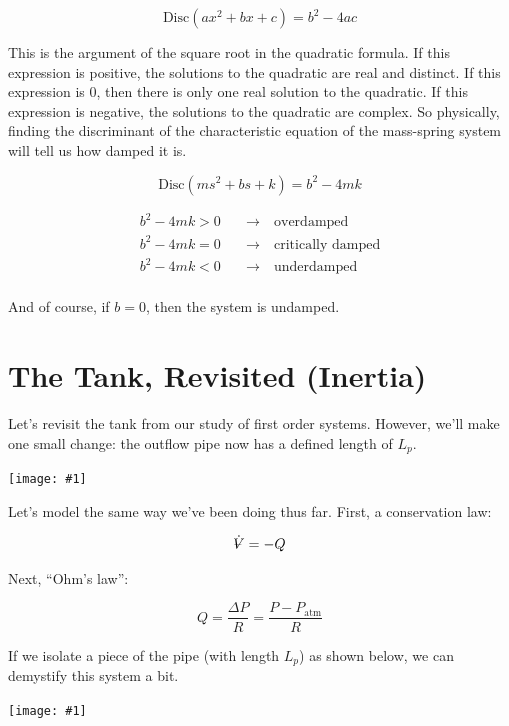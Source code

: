 \documentclass{report}
\newcommand{\Volume}{{\ooalign{\hfil$V$\hfil\cr\kern0.08em--\hfil\cr}}}
\newcommand{\bicture}[1]{
\begin{center}
    {\texttt{[image: \#1]}}
\end{center}}
\begin{document}
\begin{onehalfspacing}
\begin{flushleft}
\vspace{-0.1in}
\[\text{Disc}(ax^2 + bx + c) = b^2-4ac\]

This is the argument of the square root in the quadratic formula. If this expression is positive, the solutions to the quadratic are real and distinct. If this expression is 0, then there is only one real solution to the quadratic. If this expression is negative, the solutions to the quadratic are complex. So physically, finding the discriminant of the characteristic equation of the mass-spring system will tell us how damped it is.

\vspace{-0.1in}
\[\text{Disc}(ms^2 + bs + k) = b^2-4mk\]

\vspace{-0.35in}

\begin{align*}
    b^2 - 4mk > 0 \quad &\to \quad \text{overdamped} \\
    b^2 - 4mk = 0 \quad &\to \quad \text{critically damped} \\
    b^2 - 4mk < 0 \quad &\to \quad \text{underdamped} \\
\end{align*}

\vspace{-0.35in}

And of course, if \(b=0\), then the system is undamped. 

\section{The Tank, Revisited (Inertia)}

Let's revisit the tank from our study of first order systems. However, we'll make one small change: the outflow pipe now has a defined length of \(L_p\). 

\bicture{6_inert}

Let's model the same way we've been doing thus far. First, a conservation law:

\vspace{-0.1in}
\[\dot{\Volume} = -Q\]

Next, ``Ohm's law'':

\vspace{-0.1in}
\[Q = \frac{\Delta P}{R} = \frac{P - P_\text{atm}}{R}\]

If we isolate a piece of the pipe (with length \(L_p\)) as shown below, we can demystify this system a bit.

\bicture{6_pipe}


\end{flushleft}
\end{onehalfspacing}
\end{document}
